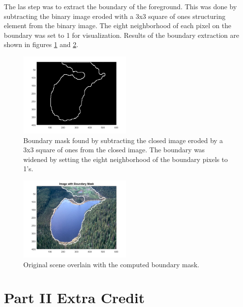 \documentclass{article}[12 pt]
\begin{document}
\noindent
The las step was to extract the boundary of the foreground.  This was done by subtracting the binary image eroded with a 3x3 square of ones structuring element from the binary image.  The eight neighborhood of each pixel on the boundary was set to 1 for visualization.  Results of the boundary extraction are shown in figures \ref{boundMask} and \ref{segmented}.  

\begin{center}
	\begin{figure}[H]
		\centering
		\includegraphics[width = 0.5\textwidth]{Images/boundaryMask.png}
		\caption{Boundary mask found by subtracting the closed image eroded by a 3x3 square of ones from the closed image.  The boundary was widened by setting the eight neighborhood of the boundary pixels to 1's. }
		\label{boundMask}
	\end{figure}
\end{center}
\begin{center}
	\begin{figure}[H]
		\centering
		\includegraphics[width = 0.5\textwidth]{Images/segmentedScene.png}
		\caption{Original scene overlain with the computed boundary mask.}
		\label{segmented}
	\end{figure}
\end{center}



\section*{Part II Extra Credit}
\end{document}
